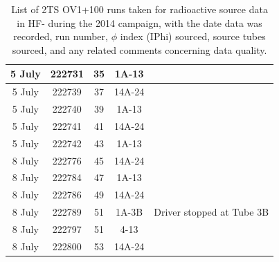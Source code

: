 \begin{table}[htb]
{\begin{tabular}{|c|c|c|c|c|}
  \hline
  5 July & 222731 & 35 & 1A-13 & \\
  \hline
  5 July & 222739 & 37 & 14A-24 & \\
  \hline
  5 July & 222740 & 39 & 1A-13 & \\
  \hline
  5 July & 222741 & 41 & 14A-24 & \\
  \hline
  5 July & 222742 & 43 & 1A-13 & \\
  \hline
  8 July & 222776 & 45 & 14A-24 & \\
  \hline
  8 July & 222784 & 47 & 1A-13 & \\
  \hline
  8 July & 222786 & 49 & 14A-24 & \\
  \hline
  8 July & 222789 & 51 & 1A-3B & Driver stopped at Tube 3B \\
  \hline
  8 July & 222797 & 51 & 4-13 & \\
  \hline
  8 July & 222800 & 53 & 14A-24 & \\
  \hline
  \end{tabular}}
  \caption{List of 2TS OV1+100 runs taken for radioactive source data in HF- during the 2014
  campaign, with the date data was recorded, run number, $\phi$ index (IPhi) sourced, source
  tubes sourced, and any related comments concerning data quality.}
  \label{tab:2014HFM_Runs_2TSOV1p100}
\end{table}

